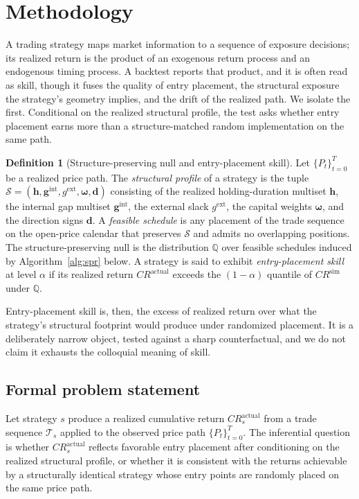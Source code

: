 \documentclass[preprint,12pt]{elsarticle}
\theoremstyle{definition}
\newtheorem{definition}{Definition}
\begin{document}
\section{Methodology}

A trading strategy maps market information to a sequence of exposure decisions;
its realized return is the product of an exogenous return process and an
endogenous timing process. A backtest reports that product, and it is often read as
skill, though it fuses the quality of entry placement, the structural
exposure the strategy's geometry implies, and the drift of the realized path. We
isolate the first. Conditional on the realized structural profile, the test asks
whether entry placement earns more than a structure-matched random implementation
on the same path.

\begin{definition}[Structure-preserving null and entry-placement skill]
Let $\{P_t\}_{t=0}^{T}$ be a realized price path. The \emph{structural profile} of a strategy is the tuple $\mathcal{S} = (\mathbf{h}, \mathbf{g}^{\mathrm{int}}, g^{\mathrm{ext}}, \boldsymbol{\omega}, \mathbf{d})$ consisting of the realized holding-duration multiset $\mathbf{h}$, the internal gap multiset $\mathbf{g}^{\mathrm{int}}$, the external slack $g^{\mathrm{ext}}$, the capital weights $\boldsymbol{\omega}$, and the direction signs $\mathbf{d}$. A \emph{feasible schedule} is any placement of the trade sequence on the open-price calendar that preserves $\mathcal{S}$ and admits no overlapping positions. The structure-preserving null is the distribution $\mathbb{Q}$ over feasible schedules induced by Algorithm~\ref{alg:spr} below. A strategy is said to exhibit \emph{entry-placement skill} at level $\alpha$ if its realized return $CR^{\mathrm{actual}}$ exceeds the $(1-\alpha)$ quantile of $CR^{\mathrm{sim}}$ under $\mathbb{Q}$.
\end{definition}

Entry-placement skill is, then, the excess of realized return over what the strategy's structural footprint would produce under randomized placement. It is a deliberately narrow object, tested against a sharp counterfactual, and we do not claim it exhausts the colloquial meaning of skill.

\subsection{Formal problem statement}

Let strategy $s$ produce a realized cumulative return $CR_s^{\mathrm{actual}}$ from a trade sequence $\mathcal{T}_s$ applied to the observed price path $\{P_t\}_{t=0}^{T}$. The inferential question is whether $CR_s^{\mathrm{actual}}$ reflects favorable entry placement after conditioning on the realized structural profile, or whether it is consistent with the returns achievable by a structurally identical strategy whose entry points are randomly placed on the same price path.
\end{document}
